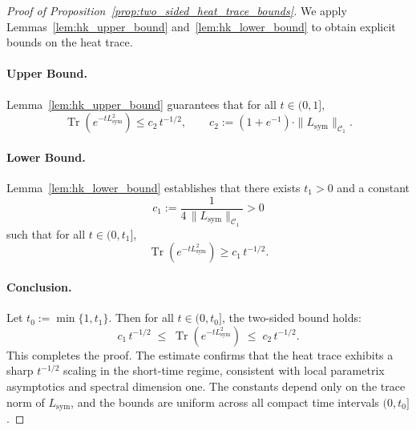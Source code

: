 \begin{proof}[Proof of Proposition~\ref{prop:two_sided_heat_trace_bounds}]
We apply Lemmas~\ref{lem:hk_upper_bound} and~\ref{lem:hk_lower_bound} to obtain explicit bounds on the heat trace.

\paragraph{Upper Bound.}
Lemma~\ref{lem:hk_upper_bound} guarantees that for all \( t \in (0,1] \),
\[
\operatorname{Tr}(e^{-t L_{\mathrm{sym}}^2}) \leq c_2 \, t^{-1/2}, \qquad
c_2 := (1 + e^{-1}) \cdot \| L_{\mathrm{sym}} \|_{\mathcal{C}_1}.
\]

\paragraph{Lower Bound.}
Lemma~\ref{lem:hk_lower_bound} establishes that there exists \( t_1 > 0 \) and a constant
\[
c_1 := \frac{1}{4 \, \| L_{\mathrm{sym}} \|_{\mathcal{C}_1}} > 0
\]
such that for all \( t \in (0, t_1] \),
\[
\operatorname{Tr}(e^{-t L_{\mathrm{sym}}^2}) \geq c_1 \, t^{-1/2}.
\]

\paragraph{Conclusion.}
Let \( t_0 := \min\{1, t_1\} \). Then for all \( t \in (0, t_0] \), the two-sided bound holds:
\[
c_1 \, t^{-1/2} \;\leq\; \operatorname{Tr}(e^{-t L_{\mathrm{sym}}^2}) \;\leq\; c_2 \, t^{-1/2}.
\]
This completes the proof. The estimate confirms that the heat trace exhibits a sharp \( t^{-1/2} \) scaling in the short-time regime, consistent with local parametrix asymptotics and spectral dimension one. The constants depend only on the trace norm of \( L_{\mathrm{sym}} \), and the bounds are uniform across all compact time intervals \( (0, t_0] \).
\end{proof}
